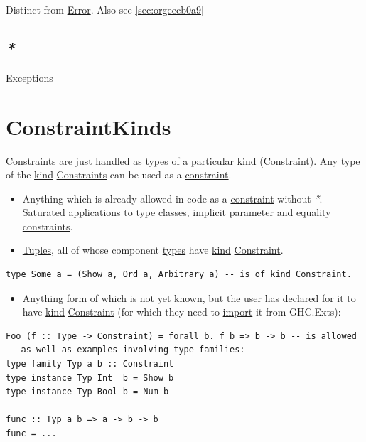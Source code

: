 \documentclass[a4paper,14pt,oneside]{book}
\begin{document}
Distinct from \hyperref[orgcc32ddd]{Error}. Also see \ref{sec:orgeecb0a9}

\section{\emph{*}}
\label{sec:org40e3763}

\label{orgd6f61a0}Exceptions

\chapter{\label{org1f57db1}ConstraintKinds}
\label{sec:orgf14519f}
\hyperref[orgf91611c]{Constraints} are just handled as \hyperref[orgf053dd8]{types} of a particular \hyperref[org6332eef]{kind} (\hyperref[orge381a99]{Constraint}).
Any \hyperref[orgc3baa5c]{type} of the \hyperref[org6332eef]{kind} \hyperref[orgf91611c]{Constraints} can be used as a \hyperref[orge381a99]{constraint}.
\begin{itemize}
\item Anything which is already allowed in code as a \hyperref[orge381a99]{constraint} without \emph{*}. Saturated applications to \hyperref[org6d530e7]{type classes}, implicit \hyperref[orgb39d8d2]{parameter} and equality \hyperref[orgf91611c]{constraints}.
\item \hyperref[orgf3262fe]{Tuples}, all of whose component \hyperref[orgf053dd8]{types} have \hyperref[org6332eef]{kind} \hyperref[orge381a99]{Constraint}.
\end{itemize}
\begin{verbatim}
type Some a = (Show a, Ord a, Arbitrary a) -- is of kind Constraint.
\end{verbatim}
\begin{itemize}
\item Anything form of which is not yet known, but the user has declared for it to have \hyperref[org6332eef]{kind} \hyperref[orge381a99]{Constraint} (for which they need to \hyperref[orga2b0d25]{import} it from GHC.Exts):
\end{itemize}
\begin{verbatim}
Foo (f :: Type -> Constraint) = forall b. f b => b -> b -- is allowed
-- as well as examples involving type families:
type family Typ a b :: Constraint
type instance Typ Int  b = Show b
type instance Typ Bool b = Num b

func :: Typ a b => a -> b -> b
func = ...
\end{verbatim}
\end{document}
